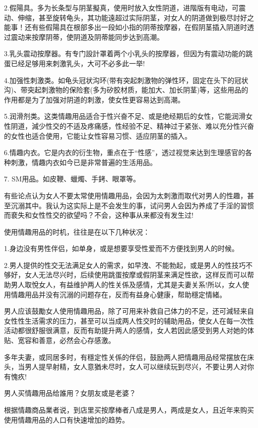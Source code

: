 \documentclass[12pt,UTF8]{ctexbook}
\begin{document}
2.假陽具。多为长条型与阴茎擬真，使用时放入女性阴道，进階版有电动，可震动、伸缩，甚至旋转龟头，其功能遠超过实际阴茎，对女人的阴道做到极尽討好之能事！还有些假陽具在根部多出一段如小指的阴蒂按摩器，在假阴茎插入阴道时透过震动来按摩阴蒂，使阴道及阴蒂能同步达到高潮。

3.乳头震动按摩器。有专门設計罩着两个小乳头的按摩器，但因为有震动功能的跳蛋已经足够用来刺激乳头，大可不必多此一举!

4.加强性刺激类。如龟头冠状沟环(带有突起刺激物的弹性环，固定在头下的冠状沟)、带突起刺激物的保险套(多为矽胶材质，能加大、加长阴茎)等，这些用品的作用都是为了加强对阴道的刺激，使女性更容易达到高潮。

5.润滑剂类。这类情趣用品适合于性兴奋不足、或是绝经期后的女性，它能润滑女性阴道，減少性交的不适及疼痛感，性经验不足、精神过于紧张、难以充分性兴奋的女性也适合使用，它能让女性容易习惯、适应阴茎的插入。

6.情趣内衣。它是内衣的衍生物，重点在于“性感”，透过视觉来达到生理感官的各种刺激，情趣内衣如今已是非常普遍的生活用品。

7. SM用品。如皮鞭、蠟燭、手銬、眼罩等。

有些论点认为女人不要太常使用情趣用品，会因为太刺激而取代对男人的性趣，甚至沉溺其中。我认为这实际上是不会发生的事，试问男人会因为养成了手淫的習惯而裵失和女性性交的欲望吗？不会，这种事从来都没有发生过!

使用情趣用品的时机，往往是在以下几种状况：

1.身边没有男性伴侣，如单身，或是想要享受性爱而不方便找到男人的时候。

2.男人提供的性交无法满足女人的需求，如早洩、不能勃起，或是男人的性技巧不够好，女人无法尽兴时，后续使用跳蛋按摩或假阴茎来满足性欲，这样反而可以帮助男人取悅女人，有益维护两人的性关係及感情，尤其是夫妻关系!所以，女人使用情趣用品并没有沉溺的问题存在，反而有益身心健康，帮助穩定情緒。

男人应该鼓勵女人使用情趣用品，除了可用来补救自己体力的不足，还可減轻来自女性性生活需求的压力，甚至可以当成两人性交时的辅助用品，使女人在每一次性活动都很舒服很满意，反而有助提升两人的感情，女人若因此感受到男人对她的体贴、宽容和善意，必然会心存感激。

多年夫妻，或同居多时，有穩定性关係的伴侣，鼓励两人把情趣用品经常摆放在床头，当男人提早射精，女人意猶未尽时，女人可以继续玩到尽兴，不要让男人对你有愧疚!

男人买情趣用品给誰用？女朋友或是老婆？

根据情趣商品業者说，到店里买按摩棒者八成是男人，两成是女人，且近年来购买使用情趣用品的人口有快速增加的趋势。
\end{document}

